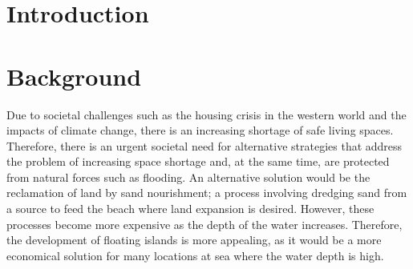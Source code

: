 \section{Introduction}
\label{section:introduction}







\section{Background}
\label{sec:intro background}
Due to societal challenges such as the housing crisis in the western world and the impacts of climate change, there is an increasing shortage of safe living spaces. Therefore, there is an urgent societal need for alternative strategies that address the problem of increasing space shortage and, at the same time, are protected from natural forces such as flooding. An alternative solution would be the reclamation of land by sand nourishment; a process involving dredging sand from a source to feed the beach where land expansion is desired.  However, these processes become more expensive as the depth of the water increases. Therefore, the development of floating islands is more appealing, as it would be a more economical solution for many locations at sea where the water depth is high.  



